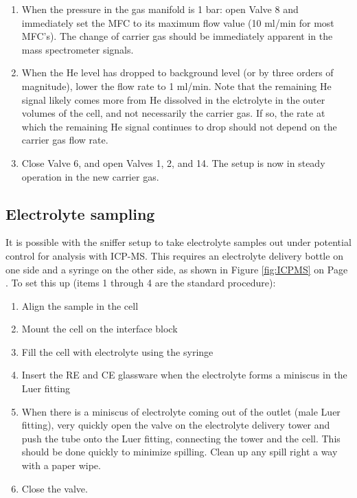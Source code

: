 \begin{enumerate}
	\item When the pressure in the gas manifold is 1 bar: open Valve 8 and immediately set the MFC to its maximum flow value (10 ml/min for most MFC's). The change of carrier gas should be immediately apparent in the mass spectrometer signals.
	
	\item When the He level has dropped to background level (or by three orders of magnitude), lower the  flow rate to 1 ml/min. Note that the remaining He signal likely comes more from He dissolved in the elctrolyte in the outer volumes of the cell, and not necessarily the carrier gas. If so, the rate at which the remaining He signal continues to drop should not depend on the carrier gas flow rate.
	
	\item Close Valve 6, and open Valves 1, 2, and 14. The setup is now in steady operation in the new carrier gas.
	
\end{enumerate}


\subsection{Electrolyte sampling}\label{app:sampling}

It is possible with the sniffer setup to take electrolyte samples out under potential control for analysis with ICP-MS. This requires an electrolyte delivery bottle on one side and a syringe on the other side, as shown in Figure \ref{fig:ICPMS} on Page \pageref{fig:ICPMS}. To set this up (items 1 through 4 are the standard procedure):
\begin{enumerate}
	\item Align the sample in the cell
	
	\item Mount the cell on the interface block
	
	\item Fill the cell with electrolyte using the syringe
	
	\item Insert the RE and CE glassware when the electrolyte forms a miniscus in the Luer fitting
	
	\item When there is a miniscus of electrolyte coming out of the outlet (male Luer fitting), very quickly open the valve on the electrolyte delivery tower and push the tube onto the Luer fitting, connecting the tower and the cell. This should be done quickly to minimize spilling. Clean up any spill right a way with a paper wipe.
	
	\item Close the valve.
\end{enumerate}

